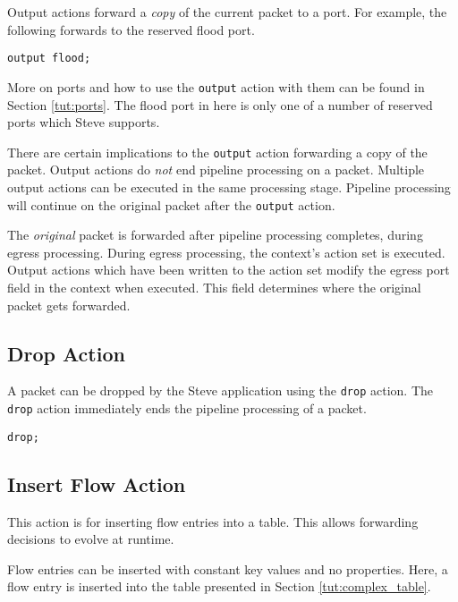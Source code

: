 Output actions forward a \textit{copy} of the current packet to a port. 
For example, the following forwards to the reserved flood port. 

\begin{codepage}
\begin{lstlisting}
output flood;
\end{lstlisting}
\end{codepage}

More on ports and how to use the \texttt{output} action with them can
be found in Section \ref{tut:ports}. The flood port in here is only one
of a number of reserved ports which Steve supports.

There are certain implications to the \texttt{output} action forwarding a copy of the packet. 
Output actions do \emph{not} end pipeline processing on a packet.
Multiple output actions can be executed in the same processing stage. 
Pipeline processing will continue
on the original packet after the \texttt{output} action.

The \textit{original} packet is forwarded after pipeline processing completes,
during egress processing.
During egress processing, the context's action set is executed.
Output actions which have been written to the action set modify the
egress port field in the context when executed.
This field determines where the original packet gets forwarded.

\subsection{Drop Action} \label{tut:drop_action}

A packet can be dropped by the Steve application using the \texttt{drop} action.
The \texttt{drop} action immediately ends the pipeline processing of a packet.

\begin{codepage}
\begin{lstlisting}
drop;
\end{lstlisting}
\end{codepage}

\subsection{Insert Flow Action} \label{tut:insert_flow_action}

This action is for inserting flow entries into a table.
This allows forwarding decisions to evolve at runtime.

Flow entries can be inserted with constant key values and no properties. Here,
a flow entry is inserted into the table presented in Section
\ref{tut:complex_table}.

